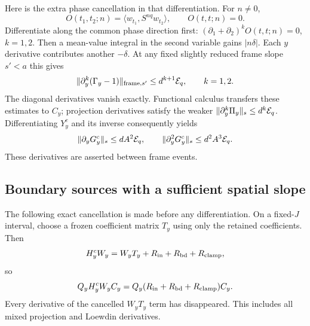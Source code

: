 Here is the extra phase cancellation in that differentiation. For $n\ne0$,
\[
 O(t_1,t_2;n)=\langle w_{t_1},S^{nq}w_{t_2}\rangle,\qquad O(t,t;n)=0.
\]
Differentiate along the common phase direction first:
$(\partial_1+\partial_2)^kO(t,t;n)=0$, $k=1,2$.
Then a mean-value integral in the second variable gains $|n\delta|$.
Each $y$ derivative contributes another $-\delta$. At any fixed slightly reduced frame slope $s'<a$ this gives
\begin{equation}\label{eq:belowGramderivative}
 \|\partial_y^k(\Gamma_y-1)\|_{\text{frame},s'}
 \le d^{k+1}\mathcal E_q,\qquad k=1,2.
\end{equation}
The diagonal derivatives vanish exactly. Functional calculus transfers these estimates to $C_y$; projection derivatives satisfy the weaker
$\|\partial_y^k\Pi_y\|_s\le d^k\mathcal E_q$.
Differentiating $Y_y^c$ and its inverse consequently yields
\[
 \|\partial_yG_y^c\|_s\le dA^2\mathcal E_q,\qquad
 \|\partial_y^2G_y^c\|_s\le d^2A^3\mathcal E_q.
\]
These derivatives are asserted between frame events.

\subsection{Boundary sources with a sufficient spatial slope}
The following exact cancellation is made before any differentiation.
On a fixed-$J$ interval, choose a frozen coefficient matrix $T_y$ using only the retained coefficients. Then
\[
 H_y^cW_y=W_yT_y+R_{\rm in}+R_{\rm bd}+R_{\rm clamp},
\]
so
\begin{equation}\label{eq:belowresidualcancel}
 Q_yH_y^cW_yC_y
       =Q_y(R_{\rm in}+R_{\rm bd}+R_{\rm clamp})C_y.
\end{equation}
Every derivative of the cancelled $W_yT_y$ term has disappeared.
This includes all mixed projection and Loewdin derivatives.

